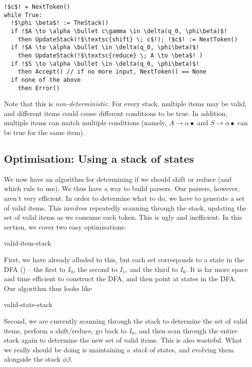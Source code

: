 \begin{code}
\begin{lstlisting}[style=pseudocode]
!$c$! = NextToken()
while True:
  !$\phi \beta$! := TheStack()
  if !$A \to \alpha \bullet c\gamma \in \delta(q_0, \phi\beta)$!
    then UpdateStack(!$\textsc{shift} \; c$!); !$c$! := NextToken()
  if !$A \to \alpha \bullet \in \delta(q_0, \phi\beta)$!
    then UpdateStack(!$\textsc{reduce} \; A \to \beta$! )
  if !$S \to \alpha \bullet \in \delta(q_0, \phi\beta)$!
    then Accept() // if no more input, NextToken() == None
  if none of the above
    then Error()
\end{lstlisting} 
\vspace{3mm}
\end{code}
Note that this is \textit{non-deterministic}. For every stack, multiple items may be valid, and different items could cause different conditions to be true. In addition, multiple items can match multiple conditions (namely, $A \to \alpha \bullet$ and $S \to \alpha \bullet$ can be true for the same item).

\subsection{Optimisation: Using a stack of states}\label{section:lr-stack-state}
We now have an algorithm for determining if we should shift or reduce (and which rule to use). We thus have a way to build parsers. Our parsers, however, aren't very efficient. In order to determine what to do, we have to generate a set of valid items. This involves repeatedly scanning through the stack, updating the set of valid items as we consume each token. This is ugly and inefficient. In this section, we cover two easy optimisations:

\begin{center}
    {valid-item-stack}
\end{center}

First, we have already alluded to this, but each set corresponds to a state in the DFA () -- the first to $I_0$, the second to $I_1$, and the third to $I_6$. It is far more space and time efficient to construct the DFA, and then point at states in the DFA. Our algorithm thus looks like

\begin{center}
    {valid-state-stack}
\end{center}

Second, we are currently scanning through the stack to determine the set of valid items, perform a shift/reduce, go back to $I_0$, and then scan through the entire stack again to determine the new set of valid items. This is also wasteful. What we really should be doing is maintaining a \textit{stack} of states, and evolving them alongside the stack $\phi\beta$. 

